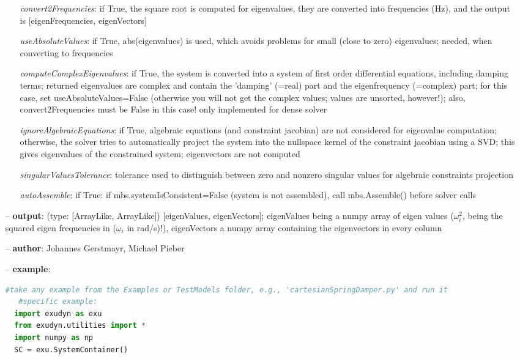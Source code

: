 \begin{itemize}[leftmargin=0.7cm]
\begin{itemize}[leftmargin=1.2cm]
\item[]{\it convert2Frequencies}: if True, the square root is computed for eigenvalues, they are converted into frequencies (Hz), and the output is [eigenFrequencies, eigenVectors]
\item[]{\it useAbsoluteValues}: if True, abs(eigenvalues) is used, which avoids problems for small (close to zero) eigenvalues; needed, when converting to frequencies
\item[]{\it computeComplexEigenvalues}: if True, the system is converted into a system of first order differential equations, including damping terms; returned eigenvalues are complex and contain the 'damping' (=real) part and the eigenfrequency (=complex) part; for this case, set useAbsoluteValues=False (otherwise you will not get the complex values; values are unsorted, however!); also, convert2Frequencies must be False in this case! only implemented for dense solver
\item[]{\it ignoreAlgebraicEquations}: if True, algebraic equations (and constraint jacobian) are not considered for eigenvalue computation; otherwise, the solver tries to automatically project the system into the nullspace kernel of the constraint jacobian using a SVD; this gives eigenvalues of the constrained system; eigenvectors are not computed
\item[]{\it singularValuesTolerance}: tolerance used to distinguish between zero and nonzero singular values for algebraic constraints projection
\item[]{\it autoAssemble}: if True: if mbs.systemIsConsistent=False (system is not assembled), call mbs.Assemble() before solver calls
\end{itemize}
\item[--]
{\bf output}: (type: [ArrayLike, ArrayLike]) [eigenValues, eigenVectors]; eigenValues being a numpy array of eigen values ($\omega_i^2$, being the squared eigen frequencies in ($\omega_i$ in rad/s)!), eigenVectors a numpy array containing the eigenvectors in every column
\item[--]
{\bf author}: Johannes Gerstmayr, Michael Pieber
\item[--]
{\bf example}: \vspace{-12pt}\ei\begin{lstlisting}[language=Python, xleftmargin=36pt]
   #take any example from the Examples or TestModels folder, e.g., 'cartesianSpringDamper.py' and run it
   #specific example:
  import exudyn as exu
  from exudyn.utilities import *
  import numpy as np
  SC = exu.SystemContainer()

\end{lstlisting}
\end{itemize}
